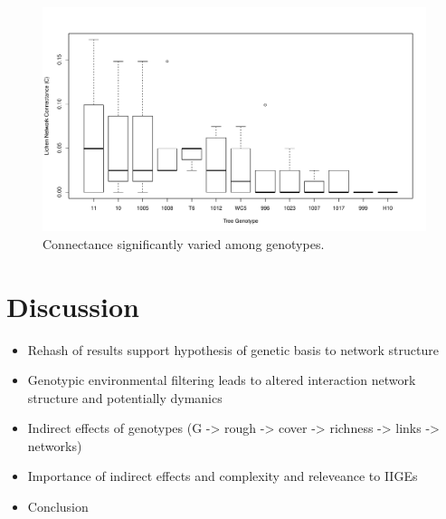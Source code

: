 \documentclass[9pt,twocolumn,twoside,lineno]{pnas-new}
\begin{document}
{\begin{figure}[ht]
\centering
\includegraphics[width=\linewidth]{connect_geno.pdf}
\caption{Connectance significantly varied among genotypes.}
\label{fig:connect}
\end{figure}






}


\showmatmethods{} %


\section*{Discussion}

\begin{itemize}
\item Rehash of results support hypothesis of genetic basis to network structure
\item Genotypic environmental filtering leads to altered interaction
  network structure and potentially dymanics
\item Indirect effects of genotypes (G -> rough -> cover -> richness
  -> links -> networks)
\item Importance of indirect effects and complexity and releveance to IIGEs
\item Conclusion
\end{itemize}
\end{document}
